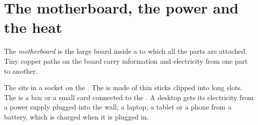 \section{The motherboard, the power and the heat}

\begin{definition}[Motherboard]\label{def:g3:inside-the-computer:motherboard}
The \emph{motherboard} is the large board inside a
 to which all the parts are attached. Tiny copper paths on the board
carry information and electricity from one part to another.
\end{definition}

The  sits in a socket on the . The  is made of thin
sticks clipped into long slots. The  is a box or a small card connected
to the . A desktop  gets its electricity from a power supply
plugged into the wall; a laptop, a tablet or a phone from a battery, which is
charged when it is plugged in.

